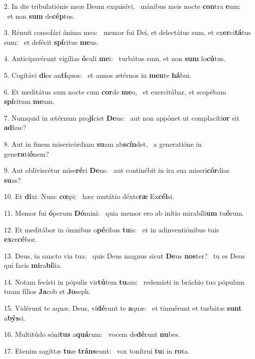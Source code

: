 2. In die tribulatiónis meæ Deum exquisívi, \dag\  mánibus meis nocte \textbf{con}tra \textbf{e}um: \ast\  et non \textbf{sum} de\textbf{cép}tus.\

3. Rénuit consolári ánima mea: \dag\  memor fui Dei, et delectátus sum, et ex\textbf{er}ci\textbf{tá}tus sum: \ast\  et defécit \textbf{spí}ritus \textbf{me}us.\

4. Anticipavérunt vigílias \textbf{ó}culi \textbf{me}i: \ast\  turbátus sum, et non \textbf{sum} lo\textbf{cú}tus.\

5. Cogitávi \textbf{di}es an\textbf{tí}quos: \ast\  et annos ætérnos in \textbf{men}te \textbf{há}bui.\

6. Et meditátus sum nocte cum \textbf{cor}de \textbf{me}o, \ast\  et exercitábar, et scopébam \textbf{spí}ritum \textbf{me}um.\

7. Numquid in ætérnum pro\textbf{jí}ciet \textbf{De}us: \ast\  aut non appónet ut complacíti\textbf{or} sit \textbf{ad}huc?\

8. Aut in finem misericórdiam \textbf{su}am ab\textbf{scín}det, \ast\  a generatióne in gene\textbf{ra}ti\textbf{ó}nem?\

9. Aut obliviscétur mise\textbf{ré}ri \textbf{De}us: \ast\  aut continébit in ira sua miseri\textbf{cór}dias \textbf{su}as?\

10. Et \textbf{di}xi: Nunc \textbf{cœ}pi: \ast\  hæc mutátio déxte\textbf{ræ} Ex\textbf{cél}si.\

11. Memor fui \textbf{ó}perum \textbf{Dó}mini: \ast\  quia memor ero ab inítio mirabíli\textbf{um} tu\textbf{ó}rum.\

12. Et meditábor in ómnibus o\textbf{pé}ribus \textbf{tu}is: \ast\  et in adinventiónibus tuis \textbf{ex}er\textbf{cé}bor.\

13. Deus, in sancto via tua: \dag\  quis Deus magnus sicut \textbf{De}us \textbf{nos}ter? \ast\  tu es Deus qui facis \textbf{mi}ra\textbf{bí}lia.\

14. Notam fecísti in pópulis vir\textbf{tú}tem \textbf{tu}am: \ast\  redemísti in bráchio tuo pópulum tuum fílios \textbf{Ja}cob et \textbf{Jo}seph.\

15. Vidérunt te aquæ, Deus, vi\textbf{dé}runt te \textbf{a}quæ: \ast\  et timuérunt et turbátæ \textbf{sunt} a\textbf{býs}si.\

16. Multitúdo sóni\textbf{tus} a\textbf{quá}rum: \ast\  vocem de\textbf{dé}runt \textbf{nu}bes.\

17. Etenim sagíttæ \textbf{tu}æ \textbf{tráns}eunt: \ast\  vox tonítrui \textbf{tu}i in \textbf{ro}ta.\

